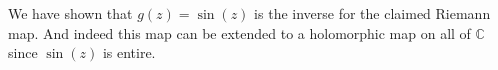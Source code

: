 \documentclass[12pt,letterpaper,boxed]{hmcpset}
\newcommand{\C}{\mathbb C}
\begin{document}
\begin{solution}
We have shown that $g(z) = \sin(z)$ is the inverse for the claimed
Riemann map. And indeed this map can be extended to a holomorphic map
on all of $\C$ since $\sin(z)$ is entire. 






\end{solution}

\newpage
\end{document}
